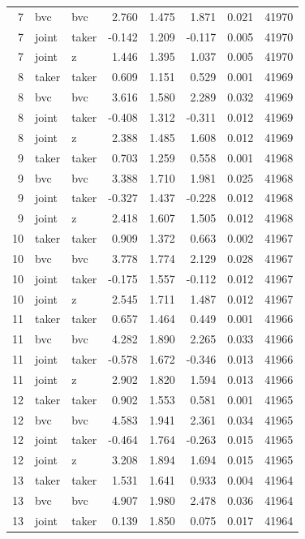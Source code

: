 \begin{tabular}{rllrrrrr}
7 & bvc & bvc & 2.760 & 1.475 & 1.871 & 0.021 & 41970 \\
7 & joint & taker & -0.142 & 1.209 & -0.117 & 0.005 & 41970 \\
7 & joint & z & 1.446 & 1.395 & 1.037 & 0.005 & 41970 \\
8 & taker & taker & 0.609 & 1.151 & 0.529 & 0.001 & 41969 \\
8 & bvc & bvc & 3.616 & 1.580 & 2.289 & 0.032 & 41969 \\
8 & joint & taker & -0.408 & 1.312 & -0.311 & 0.012 & 41969 \\
8 & joint & z & 2.388 & 1.485 & 1.608 & 0.012 & 41969 \\
9 & taker & taker & 0.703 & 1.259 & 0.558 & 0.001 & 41968 \\
9 & bvc & bvc & 3.388 & 1.710 & 1.981 & 0.025 & 41968 \\
9 & joint & taker & -0.327 & 1.437 & -0.228 & 0.012 & 41968 \\
9 & joint & z & 2.418 & 1.607 & 1.505 & 0.012 & 41968 \\
10 & taker & taker & 0.909 & 1.372 & 0.663 & 0.002 & 41967 \\
10 & bvc & bvc & 3.778 & 1.774 & 2.129 & 0.028 & 41967 \\
10 & joint & taker & -0.175 & 1.557 & -0.112 & 0.012 & 41967 \\
10 & joint & z & 2.545 & 1.711 & 1.487 & 0.012 & 41967 \\
11 & taker & taker & 0.657 & 1.464 & 0.449 & 0.001 & 41966 \\
11 & bvc & bvc & 4.282 & 1.890 & 2.265 & 0.033 & 41966 \\
11 & joint & taker & -0.578 & 1.672 & -0.346 & 0.013 & 41966 \\
11 & joint & z & 2.902 & 1.820 & 1.594 & 0.013 & 41966 \\
12 & taker & taker & 0.902 & 1.553 & 0.581 & 0.001 & 41965 \\
12 & bvc & bvc & 4.583 & 1.941 & 2.361 & 0.034 & 41965 \\
12 & joint & taker & -0.464 & 1.764 & -0.263 & 0.015 & 41965 \\
12 & joint & z & 3.208 & 1.894 & 1.694 & 0.015 & 41965 \\
13 & taker & taker & 1.531 & 1.641 & 0.933 & 0.004 & 41964 \\
13 & bvc & bvc & 4.907 & 1.980 & 2.478 & 0.036 & 41964 \\
13 & joint & taker & 0.139 & 1.850 & 0.075 & 0.017 & 41964 \\

\end{tabular}
